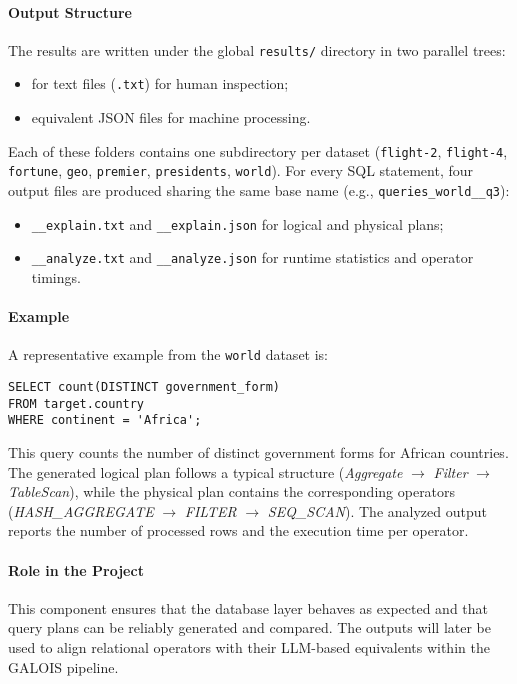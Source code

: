 \documentclass[12pt,a4paper]{article}
\begin{document}
\paragraph{Output Structure}
The results are written under the global \texttt{results/} directory in two
parallel trees:
\begin{itemize}
  \item {} for text files (\texttt{.txt}) for human inspection;
  \item {} equivalent JSON files for machine processing.
\end{itemize}

Each of these folders contains one subdirectory per dataset
(\texttt{flight-2}, \texttt{flight-4}, \texttt{fortune}, \texttt{geo},
\texttt{premier}, \texttt{presidents}, \texttt{world}). For every SQL statement,
four output files are produced sharing the same base name (e.g.,
\texttt{queries\_world\_\_q3}):
\begin{itemize}
  \item \texttt{\_\_explain.txt} and \texttt{\_\_explain.json} for logical and physical plans;
  \item \texttt{\_\_analyze.txt} and \texttt{\_\_analyze.json} for runtime statistics and operator timings.
\end{itemize}

\paragraph{Example}
A representative example from the \texttt{world} dataset is:
\begin{verbatim}
SELECT count(DISTINCT government_form)
FROM target.country
WHERE continent = 'Africa';
\end{verbatim}

This query counts the number of distinct government forms for African countries.
The generated logical plan follows a typical structure
(\emph{Aggregate} $\rightarrow$ \emph{Filter} $\rightarrow$ \emph{TableScan}),
while the physical plan contains the corresponding operators
(\emph{HASH\_AGGREGATE} $\rightarrow$ \emph{FILTER} $\rightarrow$
\emph{SEQ\_SCAN}). The analyzed output reports the number of processed rows and
the execution time per operator.

\paragraph{Role in the Project}
This component ensures that the database layer behaves as expected and that
query plans can be reliably generated and compared. The outputs will later be
used to align relational operators with their LLM-based equivalents within the
GALOIS pipeline.
\end{document}

